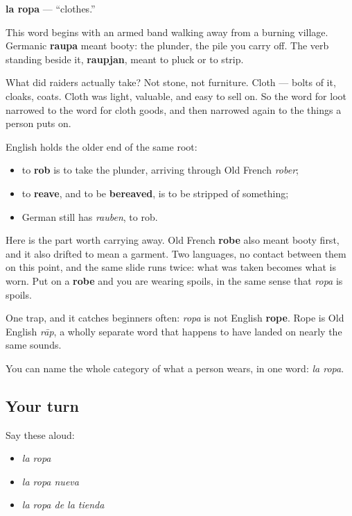 \begin{cousinweb}
\textbf{la ropa} — \textquotedblleft{}clothes.\textquotedblright{}

This word begins with an armed band walking away from a burning village. Germanic \textbf{raupa} meant booty: the plunder, the pile you carry off. The verb standing beside it, \textbf{raupjan}, meant to pluck or to strip.

What did raiders actually take? Not stone, not furniture. Cloth — bolts of it, cloaks, coats. Cloth was light, valuable, and easy to sell on. So the word for loot narrowed to the word for cloth goods, and then narrowed again to the things a person puts on.

English holds the older end of the same root:

\begin{itemize}
\raggedright
  \item to \textbf{rob} is to take the plunder, arriving through Old French \emph{rober};
  \item to \textbf{reave}, and to be \textbf{bereaved}, is to be stripped of something;
  \item German still has \emph{rauben}, to rob.
\end{itemize}

Here is the part worth carrying away. Old French \textbf{robe} also meant booty first, and it also drifted to mean a garment. Two languages, no contact between them on this point, and the same slide runs twice: what was taken becomes what is worn. Put on a \textbf{robe} and you are wearing spoils, in the same sense that \emph{ropa} is spoils.

One trap, and it catches beginners often: \emph{ropa} is not English \textbf{rope}. Rope is Old English \emph{rāp}, a wholly separate word that happens to have landed on nearly the same sounds.
\end{cousinweb}

\begin{grammarlens}[title={What you've built}]
You can name the whole category of what a person wears, in one word: \emph{la ropa}.
\end{grammarlens}

\subsection*{Your turn}
Say these aloud:

\begin{itemize}
\raggedright
  \item \emph{la ropa}
  \item \emph{la ropa nueva}
  \item \emph{la ropa de la tienda}
\end{itemize}

